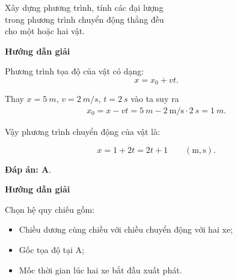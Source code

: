 \begin{dang}{Xây dựng phương trình, tính các đại lượng\\ trong phương trình chuyển động thẳng đều\\ cho một hoặc hai vật.}
	{	\begin{center}
			\textbf{Hướng dẫn giải}
		\end{center}
		
		Phương trình tọa độ của vật có dạng: 
		$$x=x_0 +vt.$$
		
		Thay $x=\SI{5}{m}$, $v=\SI{2}{m/s}$, $t=\SI{2}{s}$ vào ta suy ra 
		\begin{align*}
			x_0=x-vt=\SI{5}{m}-\SI{2}{\meter/\second}\cdot\SI{2}{s}=\SI{1}{m}.
		\end{align*}
		
		Vậy phương trình chuyển động của vật là:
		
		$$x=1+2t =2t+1\qquad\left(\si{\meter}, \si{\second}\right).$$
		
		\textbf{Đáp án: A}.
	}
	{	\begin{center}
			\textbf{Hướng dẫn giải}
		\end{center}
		
		Chọn hệ quy chiếu gồm:
		\begin{itemize}
			\item Chiều dương cùng chiều với chiều chuyển động với hai xe;
			\item Gốc tọa độ tại A;
			\item Mốc thời gian lúc hai xe bắt đầu xuất phát.
		\end{itemize}
		
}
\end{dang}
